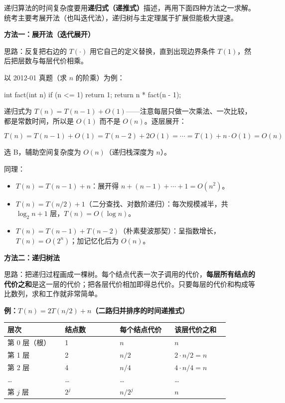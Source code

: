 \documentclass[11pt,openany,UTF8]{ctexbook}
\begin{document}
递归算法的时间复杂度要用\textbf{递归式（递推式）}描述，再用下面四种方法之一求解。统考主要考展开法（也叫迭代法），递归树与主定理属于扩展但能极大提速。

\textbf{方法一：展开法（迭代展开）}

思路：反复把右边的 $T(\cdot)$ 用它自己的定义替换，直到出现边界条件 $T(1)$，然后把层数与每层代价相乘。

以 2012-01 真题（求 $n$ 的阶乘）为例：

\begin{codebox}
int fact(int n) {
    if (n <= 1) return 1;
    return n * fact(n - 1);
}
\end{codebox}

递归式为 $T(n)=T(n-1)+O(1)$——注意每层只做一次乘法、一次比较，都是常数时间，所以是 $O(1)$ 而不是 $O(n)$。逐层展开：

\[T(n)=T(n-1)+O(1)=T(n-2)+2O(1)=\cdots=T(1)+n\cdot O(1)=O(n)\]

选 B，辅助空间复杂度为 $O(n)$（递归栈深度为 $n$）。

同理：

\begin{itemize}
\item $T(n)=T(n-1)+n$：展开得 $n+(n-1)+\cdots+1=O(n^2)$。
\item $T(n)=T(n/2)+1$（二分查找、对数阶递归）：每次规模减半，共 $\log_2 n+1$ 层，$T(n)=O(\log n)$。
\item $T(n)=T(n-1)+T(n-2)$（朴素斐波那契）：呈指数增长，$T(n)=O(2^n)$；加记忆化后为 $O(n)$。
\end{itemize}
\textbf{方法二：递归树法}

思路：把递归过程画成一棵树。每个结点代表一次子调用的代价，\textbf{每层所有结点的代价之和}是这一层的代价；把各层代价相加即得总代价。只要每层的代价和构成等比数列，求和工作就非常简单。

\textbf{例：$T(n)=2T(n/2)+n$（二路归并排序的时间递推式）}

\begingroup\small\setlength{\tabcolsep}{4.0pt}
\begin{longtable}{@{}L{0.2349\linewidth}L{0.2255\linewidth}L{0.2255\linewidth}L{0.2255\linewidth}@{}}
\toprule
\textbf{层次} & \textbf{结点数} & \textbf{每个结点代价} & \textbf{该层代价之和} \\
\midrule
\endhead
第 0 层（根） & 1 & $n$ & $n$ \\
第 1 层 & 2 & $n/2$ & $2\cdot n/2=n$ \\
第 2 层 & 4 & $n/4$ & $4\cdot n/4=n$ \\
… & … & … & … \\
第 $j$ 层 & $2^{j}$ & $n/2^{j}$ & $n$ \\
\bottomrule
\end{longtable}
\endgroup
\end{document}
